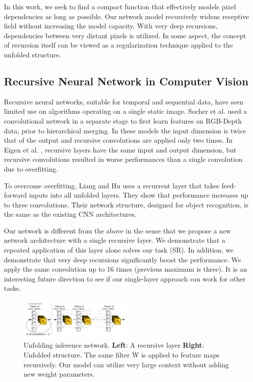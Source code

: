 \documentclass[10pt,twocolumn,letterpaper]{article}
\begin{document}
In this work, we seek to find a compact function that effectively models pixel dependencies as long as possible. Our network model recursively widens receptive field without increasing the model capacity. With very deep recursions, dependencies between very distant pixels is utilized. In some aspect, the concept of recursion itself can be viewed as a regularization technique applied to the unfolded structure. 

\subsection{Recursive Neural Network in Computer Vision}

Recursive neural networks, suitable for temporal and sequential data, have seen limited use on algorithms operating on a single static image.   Socher et al.  \cite{socher2012convolutional} used a convolutional network in a separate stage to first learn features on RGB-Depth data, prior to hierarchical merging. In these models the input dimension is twice that of the output and recursive convolutions are applied only two times. In Eigen et al. \cite{Eigen2014}, recursive layers have the same input and output dimension, but recursive convolutions resulted in worse performances than a single convolution due to overfitting. 

To overcome overfitting, Liang and Hu \cite{Liang_2015_CVPR} uses a recurrent layer that takes feed-forward inputs into all unfolded layers. They show that performance increases up to three convolutions. Their network structure, designed for object recognition, is the same as the existing CNN architectures.

Our network is different from the above in the sense that we propose a new network architecture with a single recursive layer. We demonstrate that a repeated application of this layer alone solves our task (SR). In addition, we demonstrate that very deep recursions significantly boost the performance. We apply the same convolution up to 16 times (previous maximum is three). It is an interesting future direction to see if our single-layer approach can work for other tasks.  

\begin{figure}[t]
	\includegraphics[width=0.5\textwidth]{figs/f2}
	\caption {Unfolding inference network. \textbf{Left}: A recursive layer \textbf{Right}: Unfolded structure. The same filter W is applied to feature maps recursively. Our model can utilize very large context without adding new weight parameters. }
	\label{fig:inference_network}
\end{figure}
\end{document}
